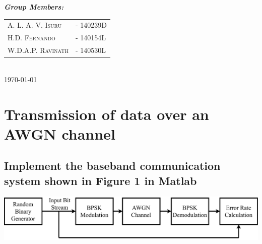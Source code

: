 \documentclass[11pt]{article}
\begin{document}
\begin{titlepage}
\emph{\large \textbf{Group Members:}}\\
\begin{tabular}{ll}\large
\large A. L. A. V. \textsc{Isuru}& \large - 140239D\\
\large H.D. \textsc{Fernando}& \large - 140154L\\
\large W.D.A.P. \textsc{Ravinath}& \large - 140530L
\end{tabular}\\[1cm]






{\large \today}\\[0.1cm] %



\vfill %

\end{titlepage}

\clearpage




\section{Transmission of data over an AWGN channel}
\subsection{Implement the baseband communication system shown in Figure 1 in Matlab}
\begin{center}
\includegraphics[width=.7\textwidth]{baseband-com-in-awgn-ch.pdf}
\label{fig:baseband-com-sys}
\end{center}
\end{document}
